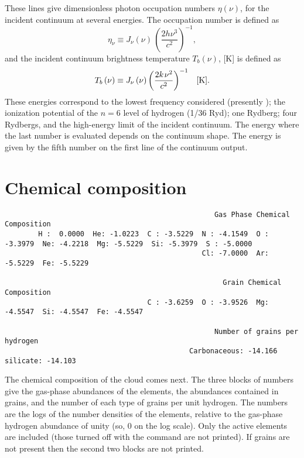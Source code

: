 These lines give dimensionless photon occupation numbers $\eta(\nu)$,
for the incident continuum at several energies.
The occupation number is defined as
\begin{equation}
{\eta _\nu } \equiv {J_\nu }\left( \nu  \right)\,{\left( {\frac{{2h{\nu
^3}}}{{{c^2}}}} \right)^{ - 1}},%
\end{equation}
and the incident continuum brightness temperature ${T_b}( \nu  )$, [K] is defined as
\begin{equation}
{T_b}\left( \nu  \right) \equiv {J_\nu }\left( \nu  \right){\left(
{\frac{{2k{\kern 1pt} {\nu ^2}}}{{{c^2}}}} \right)^{ - 1}}\quad  [\mathrm{K}].%
\end{equation}
These energies correspond to the lowest frequency considered
(presently \emm );
the ionization potential of the $n = 6$ level of hydrogen
(1/36 Ryd); one Rydberg; four Rydbergs, and the high-energy limit of the
incident continuum.
The energy where the last number is evaluated depends
on the continuum shape.
The energy is given by the fifth number on the
first line of the continuum output.

\section{Chemical composition}
{\setverbatimfontsize{\tiny}
\begin{verbatim}
                                                  Gas Phase Chemical Composition
        H :  0.0000  He: -1.0223  C : -3.5229  N : -4.1549  O : -3.3979  Ne: -4.2218  Mg: -5.5229  Si: -5.3979  S : -5.0000
                                               Cl: -7.0000  Ar: -5.5229  Fe: -5.5229

                                                    Grain Chemical Composition
                                  C : -3.6259  O : -3.9526  Mg: -4.5547  Si: -4.5547  Fe: -4.5547

                                                  Number of grains per hydrogen
                                            Carbonaceous: -14.166  silicate: -14.103
\end{verbatim}
}

The chemical composition of the cloud comes next.
The three blocks of
numbers give the gas-phase abundances of the elements, the abundances
contained in grains, and the number of each type of grains per unit hydrogen.
The numbers are the logs of the number densities of the elements, relative
to the gas-phase hydrogen abundance of unity (so, 0 on the log scale).
Only the active elements are included (those turned off with the  command are not printed).
If grains are not present then the second
two blocks are not printed.

